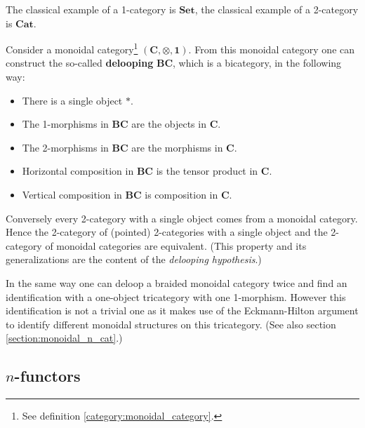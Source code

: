     \begin{example}
        The classical example of a 1-category is $\mathbf{Set}$, the classical example of a 2-category is $\mathbf{Cat}$.
    \end{example}


    \begin{property}\label{cat:monoidal_or_2}
        Consider a monoidal category\footnote{See definition \ref{category:monoidal_category}.} $(\mathbf{C}, \otimes, \mathbf{1})$. From this monoidal category one can construct the so-called \textbf{delooping} $\mathbf{BC}$, which is a bicategory, in the following way:
        \begin{itemize}
            \item There is a single object $\ast$.
            \item The 1-morphisms in $\mathbf{BC}$ are the objects in $\mathbf{C}$.
            \item The 2-morphisms in $\mathbf{BC}$ are the morphisms in $\mathbf{C}$.
            \item Horizontal composition in $\mathbf{BC}$ is the tensor product in $\mathbf{C}$.
            \item Vertical composition in $\mathbf{BC}$ is composition in $\mathbf{C}$.
        \end{itemize}
        Conversely every 2-category with a single object comes from a monoidal category. Hence the 2-category of (pointed) 2-categories with a single object and the 2-category of monoidal categories are equivalent. (This property and its generalizations are the content of the \textit{delooping hypothesis}.)

        In the same way one can deloop a braided monoidal category twice and find an identification with a one-object tricategory with one 1-morphism. However this identification is not a trivial one as it makes use of the Eckmann-Hilton argument to identify different monoidal structures on this tricategory. (See also section \ref{section:monoidal_n_cat}.)
    \end{property}

\subsection{\texorpdfstring{$n$-functors}{n-functors}}

